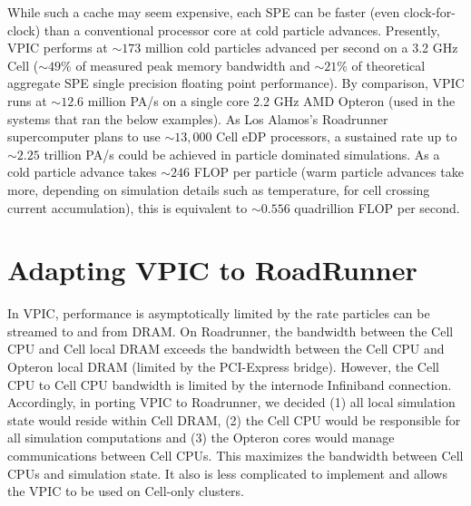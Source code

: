 \documentclass[letter,10pt]{article}
\begin{document}
While such a cache may seem expensive, each SPE can be faster (even
clock-for-clock) than a conventional processor core at cold particle
advances.  Presently, VPIC performs at $\sim 173$ million cold
particles advanced per second on a 3.2 GHz Cell ($\sim 49\%$ of
measured peak memory bandwidth and $\sim 21\%$ of theoretical
aggregate SPE single precision floating point performance).  By
comparison, VPIC runs at $\sim 12.6$ million PA/s on a single core 2.2
GHz AMD Opteron (used in the systems that ran the below examples).  As
Los Alamos's Roadrunner supercomputer plans to use $\sim 13,000$ Cell
eDP processors, a sustained rate up to $\sim 2.25$ trillion PA/s could
be achieved in particle dominated simulations.  As a cold particle
advance takes $\sim 246$ FLOP per particle (warm particle advances
take more, depending on simulation details such as temperature, for
cell crossing current accumulation), this is equivalent to $\sim
0.556$ quadrillion FLOP per second.

\section*{Adapting VPIC to RoadRunner}

In VPIC, performance is asymptotically limited by the rate particles
can be streamed to and from DRAM.  On Roadrunner, the bandwidth
between the Cell CPU and Cell local DRAM exceeds the bandwidth between
the Cell CPU and Opteron local DRAM (limited by the PCI-Express
bridge).  However, the Cell CPU to Cell CPU bandwidth is limited by
the internode Infiniband connection.  Accordingly, in porting VPIC to
Roadrunner, we decided (1) all local simulation state would reside
within Cell DRAM, (2) the Cell CPU would be responsible for all
simulation computations and (3) the Opteron cores would manage
communications between Cell CPUs.  This maximizes the bandwidth
between Cell CPUs and simulation state.  It also is less complicated
to implement and allows the VPIC to be used on Cell-only clusters.


\end{document}
